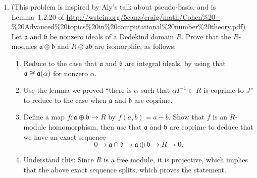 \documentclass{article}
\begin{document}
\begin{enumerate}
\item \label{last} (This problem is inspired by Aly's talk about pseudo-basis, and is Lemma~1.2.20 of \url{http://wstein.org/5canz/craig/math/Cohen\%20--\%20Advanced\%20topics\%20in\%20computational\%20number\%20theory.pdf}) Let
  $\mathfrak{a}$ and $\mathfrak{b}$ be nonzero ideals of a Dedekind domain $R$.  Prove that the
  $R$-modules $\mathfrak{a}\oplus \mathfrak{b}$ and $R\oplus
  \mathfrak{a}\mathfrak{b}$ are isomorphic, as follows:
\begin{enumerate}
\item Reduce to the case that $\mathfrak{a}$ and $\mathfrak{b}$ are
  integral ideals, by using that $\mathfrak{a}\cong
  \mathfrak{a}(\alpha)$ for nonzero $\alpha$.
\item Use the lemma we proved ``there is $\alpha$ such that $\alpha
  I^{-1}\subset R$ is coprime to $J$'' to reduce to the case when
  $\mathfrak{a}$ and $\mathfrak{b}$ are coprime.
\item Define a map $f:\mathfrak{a}\oplus \mathfrak{b} \to R$ by
  $f(a,b) = a-b$. Show that $f$ is an $R$-module homomorphism, then use
  that $\mathfrak{a}$ and $\mathfrak{b}$ are coprime to deduce that we
  have an exact sequence
$$
  0 \to \mathfrak{a}\cap \mathfrak{b} \to \mathfrak{a}\oplus \mathfrak{b} \to R \to 0.
$$
\item Understand this: Since $R$ is a free module, it is projective,
  which implies that the above exact sequence splits, which proves the
  statement.
\end{enumerate}

\end{enumerate}
\end{document}
